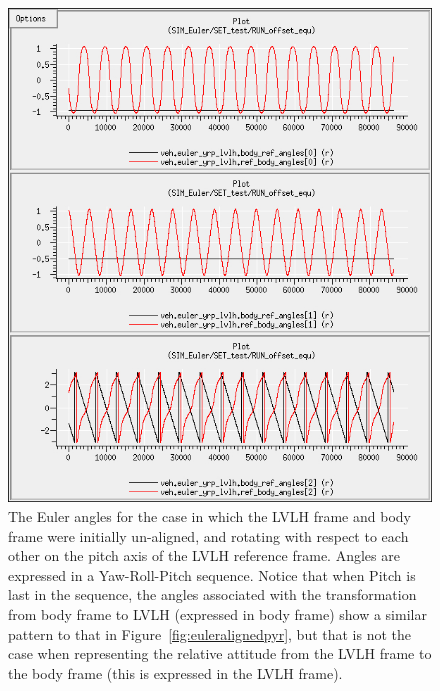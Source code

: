 \begin{description}
\begin{figure}[!ht]
\begin{center}
\includegraphics[width=5in]{figures/euler_nonaligned_yrp.jpg}
\caption{The Euler angles for the case in which the LVLH frame and body frame were initially un-aligned, and rotating with respect to each other on the pitch axis of the LVLH reference frame.  Angles are expressed in a Yaw-Roll-Pitch sequence.  Notice that when Pitch is last in the sequence, the angles associated with the transformation from body frame to LVLH (expressed in body frame) show a similar pattern to that in Figure~\ref{fig:euleralignedpyr}, but that is not the case when representing the relative attitude from the LVLH frame to the body frame (this is expressed in the LVLH frame).}
\label{fig:eulernonalignedyrp}
\end{center}
\end{figure}


\end{description}
